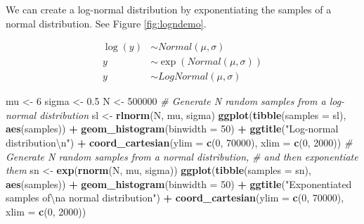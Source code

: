 \documentclass[12pt,]{krantz}
\newenvironment{Shaded}{\begin{snugshade}}{\end{snugshade}}
\newcommand{\KeywordTok}[1]{\textcolor[rgb]{0.13,0.29,0.53}{\textbf{#1}}}
\newcommand{\DataTypeTok}[1]{\textcolor[rgb]{0.13,0.29,0.53}{#1}}
\newcommand{\DecValTok}[1]{\textcolor[rgb]{0.00,0.00,0.81}{#1}}
\newcommand{\FloatTok}[1]{\textcolor[rgb]{0.00,0.00,0.81}{#1}}
\newcommand{\CharTok}[1]{\textcolor[rgb]{0.31,0.60,0.02}{#1}}
\newcommand{\StringTok}[1]{\textcolor[rgb]{0.31,0.60,0.02}{#1}}
\newcommand{\CommentTok}[1]{\textcolor[rgb]{0.56,0.35,0.01}{\textit{#1}}}
\newcommand{\OperatorTok}[1]{\textcolor[rgb]{0.81,0.36,0.00}{\textbf{#1}}}
\newcommand{\NormalTok}[1]{#1}
\theoremstyle{definition}
\theoremstyle{definition}
\theoremstyle{definition}
\theoremstyle{remark}
\begin{document}
We can create a log-normal distribution by exponentiating the samples of
a normal distribution. See Figure \ref{fig:logndemo}.

\begin{equation}
\begin{aligned}
\log(y) &\sim Normal( \mu, \sigma)\\
y &\sim \exp(Normal( \mu, \sigma)) \\
y &\sim LogNormal( \mu, \sigma)
\end{aligned}
\end{equation}

\begin{Shaded}
\begin{Highlighting}[]
\NormalTok{mu <-}\StringTok{ }\DecValTok{6}
\NormalTok{sigma <-}\StringTok{ }\FloatTok{0.5}
\NormalTok{N <-}\StringTok{ }\DecValTok{500000}
\CommentTok{# Generate N random samples from a log-normal distribution}
\NormalTok{sl <-}\StringTok{ }\KeywordTok{rlnorm}\NormalTok{(N, mu, sigma)}
\KeywordTok{ggplot}\NormalTok{(}\KeywordTok{tibble}\NormalTok{(}\DataTypeTok{samples =}\NormalTok{ sl), }\KeywordTok{aes}\NormalTok{(samples)) }\OperatorTok{+}
\StringTok{  }\KeywordTok{geom_histogram}\NormalTok{(}\DataTypeTok{binwidth =} \DecValTok{50}\NormalTok{) }\OperatorTok{+}
\StringTok{  }\KeywordTok{ggtitle}\NormalTok{(}\StringTok{"Log-normal distribution}\CharTok{\textbackslash{}n}\StringTok{"}\NormalTok{) }\OperatorTok{+}
\StringTok{  }\KeywordTok{coord_cartesian}\NormalTok{(}\DataTypeTok{ylim =} \KeywordTok{c}\NormalTok{(}\DecValTok{0}\NormalTok{, }\DecValTok{70000}\NormalTok{), }\DataTypeTok{xlim =} \KeywordTok{c}\NormalTok{(}\DecValTok{0}\NormalTok{, }\DecValTok{2000}\NormalTok{))}
\CommentTok{# Generate N random samples from a normal distribution,}
\CommentTok{# and then exponentiate them}
\NormalTok{sn <-}\StringTok{ }\KeywordTok{exp}\NormalTok{(}\KeywordTok{rnorm}\NormalTok{(N, mu, sigma))}
\KeywordTok{ggplot}\NormalTok{(}\KeywordTok{tibble}\NormalTok{(}\DataTypeTok{samples =}\NormalTok{ sn), }\KeywordTok{aes}\NormalTok{(samples)) }\OperatorTok{+}
\StringTok{  }\KeywordTok{geom_histogram}\NormalTok{(}\DataTypeTok{binwidth =} \DecValTok{50}\NormalTok{) }\OperatorTok{+}
\StringTok{  }\KeywordTok{ggtitle}\NormalTok{(}\StringTok{"Exponentiated samples of}\CharTok{\textbackslash{}n}\StringTok{a normal distribution"}\NormalTok{) }\OperatorTok{+}
\StringTok{    }\KeywordTok{coord_cartesian}\NormalTok{(}\DataTypeTok{ylim =} \KeywordTok{c}\NormalTok{(}\DecValTok{0}\NormalTok{, }\DecValTok{70000}\NormalTok{), }\DataTypeTok{xlim =} \KeywordTok{c}\NormalTok{(}\DecValTok{0}\NormalTok{, }\DecValTok{2000}\NormalTok{))}
\end{Highlighting}
\end{Shaded}
\end{document}
